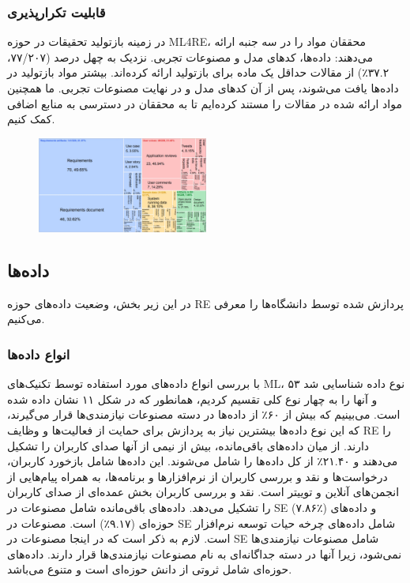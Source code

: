 \documentclass[a4paper,10pt]{article}
\begin{document}
            \subsubsection{قابلیت تکرارپذیری}

                در زمینه بازتولید تحقیقات در حوزه ML4RE، محققان مواد را در سه جنبه ارائه می‌دهند: داده‌ها، کدهای مدل و مصنوعات تجربی. نزدیک به چهل درصد (۷۷/۲۰۷، ۳۷.۲٪) از مقالات حداقل یک ماده برای بازتولید ارائه کرده‌اند. بیشتر مواد بازتولید در داده‌ها یافت می‌شوند، پس از آن کدهای مدل و در نهایت مصنوعات تجربی. ما همچنین مواد ارائه شده در مقالات را مستند کرده‌ایم تا به محققان در دسترسی به منابع اضافی کمک کنیم.

                \begin{figure}
                    \centering
                    \includegraphics[width=0.5\textwidth]{Image/fig-11.jpg}
                \end{figure}

        \subsection{داده‌ها}


            در این زیر بخش، وضعیت داده‌های حوزه RE پردازش شده توسط دانشگاه‌ها را معرفی می‌کنیم.

            \subsubsection{انواع داده‌ها}

                با بررسی انواع داده‌های مورد استفاده توسط تکنیک‌های ML، ۵۳ نوع داده شناسایی شد و آنها را به چهار نوع کلی تقسیم کردیم، همانطور که در شکل ۱۱ نشان داده شده است. می‌بینیم که بیش از ۶۰٪ از داده‌ها در دسته مصنوعات نیازمندی‌ها قرار می‌گیرند، که این نوع داده‌ها بیشترین نیاز به پردازش برای حمایت از فعالیت‌ها و وظایف RE را دارند. از میان داده‌های باقی‌مانده، بیش از نیمی از آنها صدای کاربران را تشکیل می‌دهند و ۲۱.۴۰٪ از کل داده‌ها را شامل می‌شوند. این داده‌ها شامل بازخورد کاربران، درخواست‌ها و نقد و بررسی کاربران از نرم‌افزارها و برنامه‌ها، به همراه پیام‌هایی از انجمن‌های آنلاین و توییتر است. نقد و بررسی کاربران بخش عمده‌ای از صدای کاربران را تشکیل می‌دهد. داده‌های باقی‌مانده شامل مصنوعات در SE (۷.۸۶٪) و داده‌های حوزه‌ای (۹.۱۷٪) است. مصنوعات در SE شامل داده‌های چرخه حیات توسعه نرم‌افزار است. لازم به ذکر است که در اینجا مصنوعات در SE شامل مصنوعات نیازمندی‌ها نمی‌شود، زیرا آنها در دسته جداگانه‌ای به نام مصنوعات نیازمندی‌ها قرار دارند. داده‌های حوزه‌ای شامل ثروتی از دانش حوزه‌ای است و متنوع می‌باشد.
\end{document}
